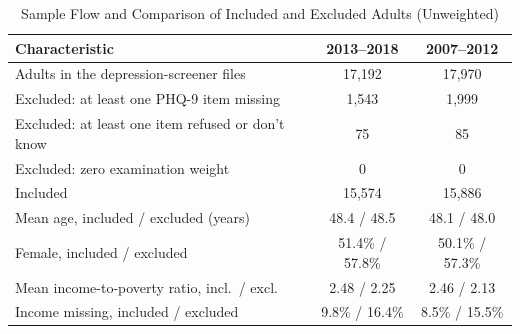 \documentclass[journal]{IEEEtran}
\begin{document}
\setcounter{table}{1}\begin{table}[!t]
\caption{Sample Flow and Comparison of Included and Excluded Adults (Unweighted)}
\centering
\scriptsize
\setlength{\tabcolsep}{3pt}
\begin{tabular}{@{}l c c@{}}
\toprule
Characteristic & 2013--2018 & 2007--2012\\
\midrule
Adults in the depression-screener files & 17,192 & 17,970\\
Excluded: at least one PHQ-9 item missing & 1,543 & 1,999\\
Excluded: at least one item refused or don't know & 75 & 85\\
Excluded: zero examination weight & 0 & 0\\
Included & 15,574 & 15,886\\
Mean age, included / excluded (years) & 48.4 / 48.5 & 48.1 / 48.0\\
Female, included / excluded & 51.4\% / 57.8\% & 50.1\% / 57.3\%\\
Mean income-to-poverty ratio, incl.\ / excl. & 2.48 / 2.25 & 2.46 / 2.13\\
Income missing, included / excluded & 9.8\% / 16.4\% & 8.5\% / 15.5\%\\
\bottomrule
\end{tabular}
\end{table}
\end{document}
